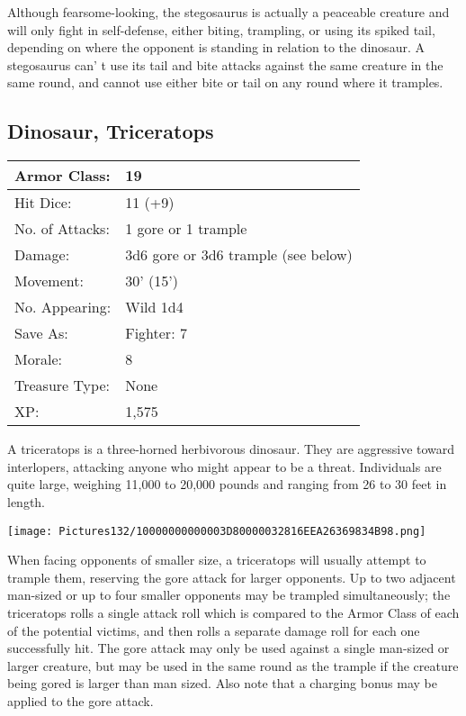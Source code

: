 \documentclass[a4paper,twoside,openany,10pt]{book}
\begin{document}
\begin{multicols}{2}
Although fearsome-looking, the stegosaurus is actually a peaceable creature and will only fight in self-defense, either biting, trampling, or using its spiked tail, depending on where the opponent is standing in relation to the dinosaur. A stegosaurus can' t use its tail and bite attacks against the same creature in the same round, and cannot use either bite or tail on any round where it tramples.

\subsection*{Dinosaur, Triceratops}\label{dinosaur-triceratops}

\begin{tabularx}{0.48\textwidth}{@{}lX@{}}
Armor Class: & 19 \\\hline
Hit Dice: & 11 (+9) \\\hline
No. of Attacks: & 1 gore or 1 trample \\\hline
Damage: & 3d6 gore or 3d6 trample (see below) \\\hline
Movement: & 30' (15') \\\hline
No. Appearing: & Wild 1d4 \\\hline
Save As: & Fighter: 7 \\\hline
Morale: & 8 \\\hline
Treasure Type: & None \\\hline
XP: & 1,575 \\\hline
\end{tabularx}\medskip

A triceratops is a three-horned herbivorous dinosaur. They are aggressive toward interlopers, attacking anyone who might appear to be a threat. Individuals are quite large, weighing 11,000 to 20,000 pounds and ranging from 26 to 30 feet in length.


\begin{center}
	\texttt{[image: Pictures132/10000000000003D80000032816EEA26369834B98.png]}
\end{center}

When facing opponents of smaller size, a triceratops will usually attempt to trample them, reserving the gore attack for larger opponents. Up to two adjacent man-sized or up to four smaller opponents may be trampled simultaneously; the triceratops rolls a single attack roll which is compared to the Armor Class of each of the potential victims, and then rolls a separate damage roll for each one successfully hit. The gore attack may only be used against a single man-sized or larger creature, but may be used in the same round as the trample if the creature being gored is larger than man sized. Also note that a charging bonus may be applied to the gore attack.



\end{multicols}
\end{document}
